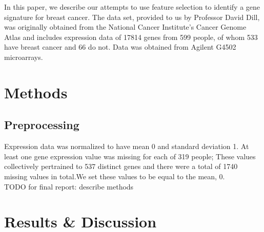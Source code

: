 \documentclass[11pt]{article}
\begin{document}
In this paper, we describe our attempts to use feature selection to identify a gene signature for breast cancer. The data set, provided to us by Professor David Dill, was originally obtained from the National Cancer Institute’s Cancer Genome Atlas and includes expression data of 17814 genes from 599 people, of whom 533 have breast cancer and 66 do not. Data was obtained from Agilent G4502 microarrays. 

\section{Methods}

\subsection{Preprocessing} 
Expression data was normalized to have mean 0 and standard deviation 1. At least one gene expression value was missing for each of 319 people; These values collectively pertrained to 537 distinct genes and there were a total of 1740 missing values in total.We set these values to be equal to the mean, 0. \\

TODO for final report: describe methods



\section{Results \& Discussion}
\end{document}
